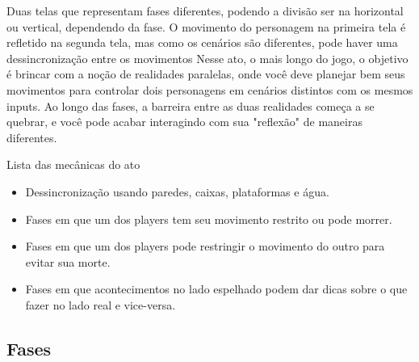 \documentclass[a4paper, 11pt]{article}
\begin{document}
\begin{itemize}
	Duas telas que representam fases diferentes, podendo a divisão ser na horizontal ou vertical, dependendo da fase. 
	O movimento do personagem na primeira tela é refletido na segunda tela, mas como os cenários são diferentes, pode 
	haver uma dessincronização entre os movimentos 
	Nesse ato, o mais longo do jogo, o objetivo é brincar com a noção de realidades paralelas, onde você deve planejar 
	bem seus movimentos para controlar dois personagens em cenários distintos com os mesmos inputs. Ao longo das fases, 
	a barreira entre as duas realidades começa a se quebrar, e você pode acabar interagindo com sua "reflexão" de  
	maneiras diferentes. 
 
	Lista das mecânicas do ato 
	\begin{itemize} 
		\item Dessincronização usando paredes, caixas, plataformas e água.
		\item Fases em que um dos players tem seu movimento restrito ou pode morrer.
		\item Fases em que um dos players pode restringir o movimento do outro para evitar sua morte.
		\item Fases em que acontecimentos no lado espelhado podem dar dicas sobre o que fazer no lado real e vice-versa.
	\end{itemize} 
 
\subsection{Fases} 
 

\end{itemize}
\end{document}
